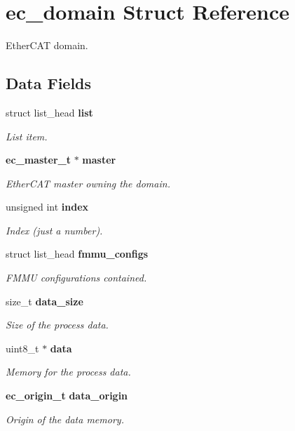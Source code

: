 \section{ec\-\_\-domain \-Struct \-Reference}
\label{structec__domain}


\-Ether\-C\-A\-T domain.  


\subsection*{\-Data \-Fields}
\begin{DoxyCompactItemize}
\item 
struct list\-\_\-head {\bf list}
\begin{DoxyCompactList}\small\item\em \-List item. \end{DoxyCompactList}\item 
{\bf ec\-\_\-master\-\_\-t} $\ast$ {\bf master}
\begin{DoxyCompactList}\small\item\em \-Ether\-C\-A\-T master owning the domain. \end{DoxyCompactList}\item 
unsigned int {\bf index}
\begin{DoxyCompactList}\small\item\em \-Index (just a number). \end{DoxyCompactList}\item 
struct list\-\_\-head {\bf fmmu\-\_\-configs}
\begin{DoxyCompactList}\small\item\em \-F\-M\-M\-U configurations contained. \end{DoxyCompactList}\item 
size\-\_\-t {\bf data\-\_\-size}
\begin{DoxyCompactList}\small\item\em \-Size of the process data. \end{DoxyCompactList}\item 
uint8\-\_\-t $\ast$ {\bf data}
\begin{DoxyCompactList}\small\item\em \-Memory for the process data. \end{DoxyCompactList}\item 
{\bf ec\-\_\-origin\-\_\-t} {\bf data\-\_\-origin}
\begin{DoxyCompactList}\small\item\em \-Origin of the {\itshape data\/} memory. \end{DoxyCompactList}\item 

\end{DoxyCompactItemize}
